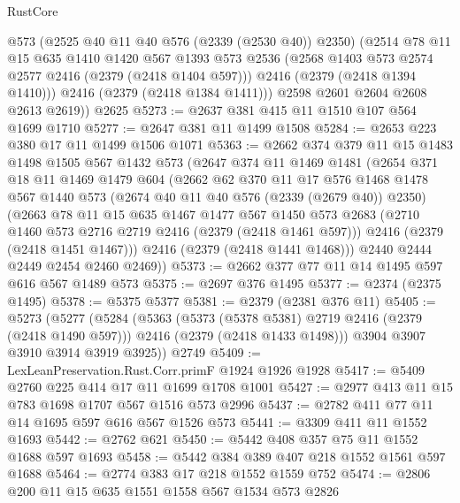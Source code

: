 \begin{lexlean}{RustCore}
\begin{coremodule}
          @573
          (@2525 @40 @11 @40 @576 (@2339 (@2530 @40)) @2350)
          (@2514
            @78
            @11
            @15
            @635
            @1410
            @1420
            @567
            @1393
            @573
            @2536
            (@2568 @1403 @573 @2574 @2577 @2416 (@2379 (@2418 @1404 @597)))
            @2416
            (@2379 (@2418 @1394 @1410)))
          @2416
          (@2379 (@2418 @1384 @1411)))
        @2598
        @2601
        @2604
        @2608
        @2613
        @2619))
    @2625
@5273 := @2637 @381 @415 @11 @1510 @107 @564 @1699 @1710
@5277 := @2647 @381 @11 @1499 @1508
@5284 := @2653 @223 @380 @17 @11 @1499 @1506 @1071
@5363 := @2662
    @374
    @379
    @11
    @15
    @1483
    @1498
    @1505
    @567
    @1432
    @573
    (@2647
      @374
      @11
      @1469
      @1481
      (@2654
        @371
        @18
        @11
        @1469
        @1479
        @604
        (@2662
          @62
          @370
          @11
          @17
          @576
          @1468
          @1478
          @567
          @1440
          @573
          (@2674 @40 @11 @40 @576 (@2339 (@2679 @40)) @2350)
          (@2663
            @78
            @11
            @15
            @635
            @1467
            @1477
            @567
            @1450
            @573
            @2683
            (@2710 @1460 @573 @2716 @2719 @2416 (@2379 (@2418 @1461 @597)))
            @2416
            (@2379 (@2418 @1451 @1467)))
          @2416
          (@2379 (@2418 @1441 @1468)))
        @2440
        @2444
        @2449
        @2454
        @2460
        @2469))
@5373 := @2662 @377 @77 @11 @14 @1495 @597 @616 @567 @1489 @573
@5375 := @2697 @376 @1495
@5377 := @2374 (@2375 @1495)
@5378 := @5375 @5377
@5381 := @2379 (@2381 @376 @11)
@5405 := @5273
    (@5277
      (@5284
        (@5363
          (@5373 (@5378 @5381) @2719 @2416 (@2379 (@2418 @1490 @597)))
          @2416
          (@2379 (@2418 @1433 @1498)))
        @3904
        @3907
        @3910
        @3914
        @3919
        @3925))
    @2749
@5409 := LexLeanPreservation.Rust.Corr.primF @1924 @1926 @1928
@5417 := @5409 @2760 @225 @414 @17 @11 @1699 @1708 @1001
@5427 := @2977 @413 @11 @15 @783 @1698 @1707 @567 @1516 @573 @2996
@5437 := @2782 @411 @77 @11 @14 @1695 @597 @616 @567 @1526 @573
@5441 := @3309 @411 @11 @1552 @1693
@5442 := @2762 @621
@5450 := @5442 @408 @357 @75 @11 @1552 @1688 @597 @1693
@5458 := @5442 @384 @389 @407 @218 @1552 @1561 @597 @1688
@5464 := @2774 @383 @17 @218 @1552 @1559 @752
@5474 := @2806 @200 @11 @15 @635 @1551 @1558 @567 @1534 @573 @2826

\end{coremodule}
\end{lexlean}
